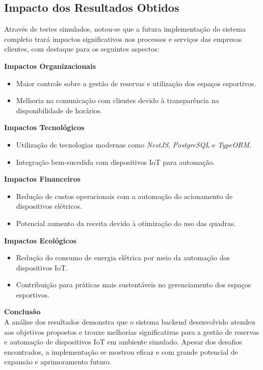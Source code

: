 \subsection{Impacto dos Resultados Obtidos}

Através de testes simulados, notou-se que a futura implementação do sistema completo trará impactos significativos nos processos e serviços das empresas clientes, com destaque para os seguintes aspectos:

\textbf{Impactos Organizacionais}\\
\begin{itemize}
    \item Maior controle sobre a gestão de reservas e utilização dos espaços esportivos.
    \item Melhoria na comunicação com clientes devido à transparência na disponibilidade de horários.
\end{itemize}

\textbf{Impactos Tecnológicos}\\
\begin{itemize}
    \item Utilização de tecnologias modernas como \textit{NestJS}, \textit{PostgreSQL} e \textit{TypeORM}.
    \item Integração bem-sucedida com dispositivos IoT para automação.
\end{itemize}

\textbf{Impactos Financeiros}\\
\begin{itemize}
    \item Redução de custos operacionais com a automação do acionamento de dispositivos elétricos.
    \item Potencial aumento da receita devido à otimização do uso das quadras.
\end{itemize}

\textbf{Impactos Ecológicos}\\
\begin{itemize}
    \item Redução do consumo de energia elétrica por meio da automação dos dispositivos IoT.
    \item Contribuição para práticas mais sustentáveis no gerenciamento dos espaços esportivos.
\end{itemize}

\textbf{Conclusão}\\
A análise dos resultados demonstra que o sistema backend desenvolvido atendeu aos objetivos propostos e trouxe melhorias significativas para a gestão de reservas e automação de dispositivos IoT em ambiente simulado. Apesar dos desafios encontrados, a implementação se mostrou eficaz e com grande potencial de expansão e aprimoramento futuro.
